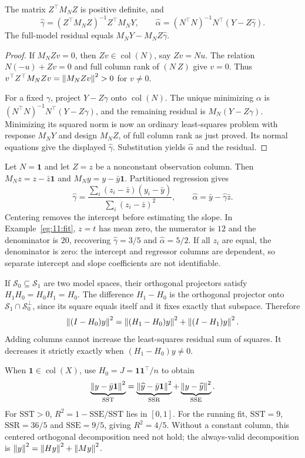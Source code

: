 \begin{theorem}\label{thm:11:fwl}
The matrix $Z^\top M_NZ$ is positive definite, and
\[
\widehat\gamma=(Z^\top M_NZ)^{-1}Z^\top M_NY,\qquad
\widehat\alpha=(N^\top N)^{-1}N^\top(Y-Z\widehat\gamma).
\]
The full-model residual equals
$M_NY-M_NZ\widehat\gamma$.
\end{theorem}
\begin{proof}
If $M_NZv=0$, then $Zv\in\operatorname{col}(N)$, say $Zv=Nu$.
The relation $N(-u)+Zv=0$ and full column rank of $(N\ Z)$ give $v=0$.
Thus $v^\top Z^\top M_NZv=\left\lVert M_NZv\right\rVert^2>0$ for $v\ne0$.

For a fixed $\gamma$, project $Y-Z\gamma$ onto $\operatorname{col}(N)$.
The unique minimizing $\alpha$ is
$(N^\top N)^{-1}N^\top(Y-Z\gamma)$, and the remaining residual is
$M_N(Y-Z\gamma)$. Minimizing its squared norm is now an ordinary
least-squares problem with response $M_NY$ and design $M_NZ$, of full
column rank as just proved. Its normal equations give the displayed
$\widehat\gamma$. Substitution yields $\widehat\alpha$ and the residual.
\end{proof}

\begin{example}
Let $N=\mathbf1$ and let $Z=z$ be a nonconstant observation column.
Then $M_Nz=z-\bar z\mathbf1$ and $M_Ny=y-\bar y\mathbf1$.
Partitioned regression gives
\[
\widehat\gamma=
\frac{\sum_i(z_i-\bar z)(y_i-\bar y)}{\sum_i(z_i-\bar z)^2},\qquad
\widehat\alpha=\bar y-\widehat\gamma\bar z.
\]
Centering removes the intercept before estimating the slope. In
Example~\ref{eg:11:fit}, $z=t$ has mean zero, the numerator is $12$ and
the denominator is $20$, recovering $\widehat\gamma=3/5$ and
$\widehat\alpha=5/2$. If all $z_i$ are equal, the denominator is zero:
the intercept and regressor columns are dependent, so separate intercept
and slope coefficients are not identifiable.
\end{example}

If $\mathcal S_0\subseteq\mathcal S_1$ are two model spaces, their orthogonal
projectors satisfy $H_1H_0=H_0H_1=H_0$. The difference $H_1-H_0$ is the
orthogonal projector onto $\mathcal S_1\cap\mathcal S_0^\perp$, since
its square equals itself and it fixes exactly that subspace. Therefore
\[
\left\lVert(I-H_0)y\right\rVert^2
=\left\lVert(H_1-H_0)y\right\rVert^2+\left\lVert(I-H_1)y\right\rVert^2.
\]
Adding columns cannot increase the least-squares residual sum of squares.
It decreases it strictly exactly when $(H_1-H_0)y\ne0$.

When $\mathbf1\in\operatorname{col}(X)$, use $H_0=J=\mathbf1\mathbf1^\top/n$
to obtain
\[
\underbrace{\left\lVert y-\bar y\mathbf1\right\rVert^2}_{\mathrm{SST}}
=\underbrace{\left\lVert\widehat y-\bar y\mathbf1\right\rVert^2}_{\mathrm{SSR}}
+\underbrace{\left\lVert y-\widehat y\right\rVert^2}_{\mathrm{SSE}}.
\]
For $\mathrm{SST}>0$, $R^2=1-\mathrm{SSE}/\mathrm{SST}$ lies in $[0,1]$.
For the running fit, $\mathrm{SST}=9$, $\mathrm{SSR}=36/5$ and
$\mathrm{SSE}=9/5$, giving $R^2=4/5$.
Without a constant column, this centered orthogonal decomposition need
not hold; the always-valid decomposition is
$\left\lVert y\right\rVert^2=\left\lVert Hy\right\rVert^2+\left\lVert My\right\rVert^2$.

